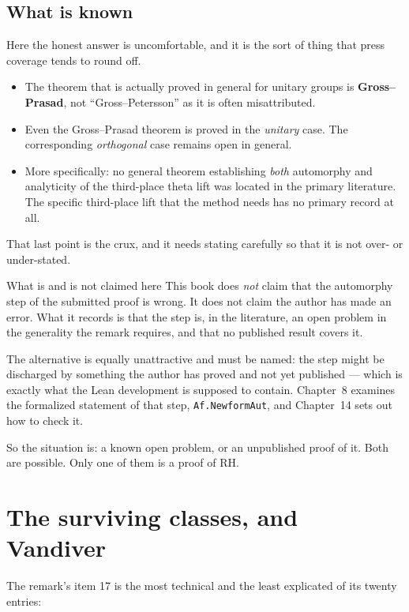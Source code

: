 \subsection{What is known}Here the honest answer is uncomfortable, and it is the sort of thing that
press coverage tends to round off.

\begin{itemize}
\item The theorem that is actually proved in general for unitary groups is
\textbf{Gross--Prasad}, not ``Gross--Petersson'' as it is often misattributed.
\item Even the Gross--Prasad theorem is proved in the \emph{unitary} case. The
corresponding \emph{orthogonal} case remains open in general.
\item More specifically: no general theorem establishing \emph{both}
automorphy and analyticity of the third-place theta lift was located in the
primary literature. The specific third-place lift that the method needs has
no primary record at all.
\end{itemize}

That last point is the crux, and it needs stating carefully so that it is not
over- or under-stated.

\begin{seamnote}{What is and is not claimed here}
This book does \emph{not} claim that the automorphy step of the submitted proof
is wrong. It does not claim the author has made an error. What it records is
that the step is, in the literature, an open problem in the generality the
remark requires, and that no published result covers it.

The alternative is equally unattractive and must be named: the step might be
discharged by something the author has proved and not yet published --- which
is exactly what the Lean development is supposed to contain. Chapter~8 examines
the formalized statement of that step, \texttt{Af.NewformAut}, and Chapter~14
sets out how to check it.

So the situation is: a known open problem, or an unpublished proof of it. Both
are possible. Only one of them is a proof of RH.
\end{seamnote}

\section{The surviving classes, and Vandiver}The remark's item 17 is the most technical and the least explicated of its
twenty entries:

